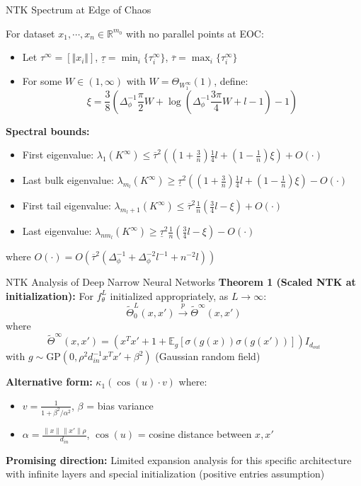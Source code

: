 \documentclass{beamer}
\newcommand{\E}{\mathbb{E}}
\newcommand{\R}{\mathbb{R}}
\newcommand{\limiting}[1]{#1^{\infty}}
\begin{document}
\begin{frame}{NTK Spectrum at Edge of Chaos}
\begin{theorem}
For dataset $x_1,\cdots,x_n \in \R^{m_0}$ with no parallel points at EOC:
\begin{itemize}
\item Let $\limiting{\tau} = [\Vert x_i \Vert]$, $\underline{\tau}=\min_i\{\limiting{\tau}_i\}$, $\overline{\tau}=\max_i\{\limiting{\tau}_i\}$
\item For some $W \in (1,\infty)$ with $W = \Theta_{\limiting{W}_1}(1)$, define:
\[ \xi = \frac{3}{8} \left( \Delta_\phi^{-1} \frac{\pi}{2} W + \log\left( \Delta_\phi^{-1} \frac{3\pi}{4} W + l - 1 \right) - 1 \right) \]
\end{itemize}

\textbf{Spectral bounds:}
\begin{itemize}
\item First eigenvalue: $\lambda_1(\limiting{K}) \leq \overline{\tau}^2 \left( \left( 1 + \frac{3}{n} \right) \frac{1}{4} l + \left( 1 - \frac{1}{n} \right) \xi \right) + O(\cdot)$
\item Last bulk eigenvalue: $\lambda_{m_l}(\limiting{K}) \geq \underline{\tau}^2 \left( \left( 1 + \frac{3}{n} \right) \frac{1}{4} l + \left( 1 - \frac{1}{n} \right) \xi \right) - O(\cdot)$
\item First tail eigenvalue: $\lambda_{m_l+1}(\limiting{K}) \leq \overline{\tau}^2 \frac{1}{n} \left( \frac{3}{4} l - \xi \right) + O(\cdot)$
\item Last eigenvalue: $\lambda_{n m_l}(\limiting{K}) \geq \underline{\tau}^2 \frac{1}{n} \left( \frac{3}{4} l - \xi \right) - O(\cdot)$
\end{itemize}
where $O(\cdot) = O\left( \overline{\tau}^2 \left( \Delta_\phi^{-1} + \Delta_\phi^{-2} l^{-1} + n^{-2} l \right) \right)$
\end{theorem}
\end{frame}


\begin{frame}{NTK Analysis of Deep Narrow Neural Networks}
\textbf{Theorem 1 (Scaled NTK at initialization):}
For $f^L_\theta$ initialized appropriately, as $L \to \infty$:
\[ \tilde{\Theta}^L_0(x, x') \xrightarrow{p} \tilde{\Theta}^\infty(x, x') \]
where
\[ \tilde{\Theta}^\infty(x, x') = (x^T x' + 1 + \E_g[\sigma(g(x))\sigma(g(x'))]) I_{d_{out}} \]
with $g \sim \text{GP}(0, \rho^2 d_{in}^{-1} x^T x' + \beta^2)$ (Gaussian random field)

\textbf{Alternative form:} $\kappa_1(\cos(u) \cdot v)$ where:
\begin{itemize}
\item $v = \frac{1}{1 + \beta^2/\alpha^2}$, $\beta$ = bias variance
\item $\alpha = \frac{\|x\| \|x'\| \rho}{d_{in}}$, $\cos(u)$ = cosine distance between $x, x'$
\end{itemize}

\textbf{Promising direction:} Limited expansion analysis for this specific architecture with infinite layers and special initialization (positive entries assumption)
\end{frame}
\end{document}
